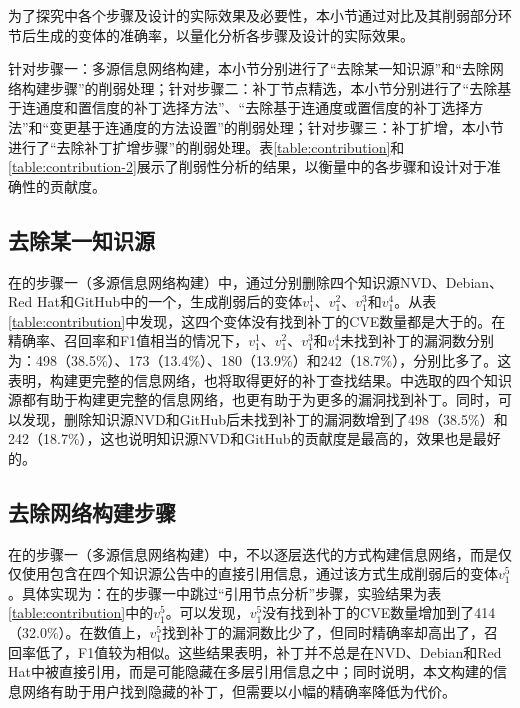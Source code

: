 为了探究\tool 中各个步骤及设计的实际效果及必要性，本小节通过对比\tool 及其削弱部分环节后生成的变体的准确率，以量化分析各步骤及设计的实际效果。

针对步骤一：多源信息网络构建，本小节分别进行了“去除某一知识源”和“去除网络构建步骤”的削弱处理；针对步骤二：补丁节点精选，本小节分别进行了“去除基于连通度和置信度的补丁选择方法”、“去除基于连通度或置信度的补丁选择方法”和“变更基于连通度的方法设置”的削弱处理；针对步骤三：补丁扩增，本小节进行了“去除补丁扩增步骤”的削弱处理。表\ref{table:contribution}和\ref{table:contribution-2}展示了削弱性分析的结果，以衡量\tool 中的各步骤和设计对于准确性的贡献度。

\subsection{去除某一知识源} 
在\tool 的步骤一（多源信息网络构建）中，通过分别删除四个知识源NVD、Debian、Red Hat和GitHub中的一个，生成削弱后的变体$v_1^1$、$v_1^2$、$v_1^3$和$v_1^4$。从表\ref{table:contribution}中发现，这四个变体没有找到补丁的CVE数量都是大于\tool 的。在精确率、召回率和F1值相当的情况下，$v_1^1$、$v_1^2$、$v_1^3$和$v_1^4$未找到补丁的漏洞数分别为：498（38.5\%）、173（13.4\%）、180（13.9\%）和242（18.7\%），分别比\tool 多了。这表明，构建更完整的信息网络，也将取得更好的补丁查找结果。\tool 中选取的四个知识源都有助于构建更完整的信息网络，也更有助于为更多的漏洞找到补丁。同时，可以发现，删除知识源NVD和GitHub后未找到补丁的漏洞数增到了498（38.5\%）和242（18.7\%），这也说明知识源NVD和GitHub的贡献度是最高的，效果也是最好的。

\subsection{去除网络构建步骤}
在\tool 的步骤一（多源信息网络构建）中，不以逐层迭代的方式构建信息网络，而是仅仅使用包含在四个知识源公告中的直接引用信息，通过该方式生成削弱后的变体$v_1^5$。具体实现为：在\tool 的步骤一中跳过“引用节点分析”步骤，实验结果为表\ref{table:contribution}中的$v_1^5$。可以发现，$v_1^5$没有找到补丁的CVE数量增加到了414（32.0\%）。在数值上，$v_1^5$找到补丁的漏洞数比\tool 少了，但同时精确率却高出了，召回率低了，F1值较为相似。这些结果表明，补丁并不总是在NVD、Debian和Red Hat中被直接引用，而是可能隐藏在多层引用信息之中；同时说明，本文构建的信息网络有助于用户找到隐藏的补丁，但需要以小幅的精确率降低为代价。



